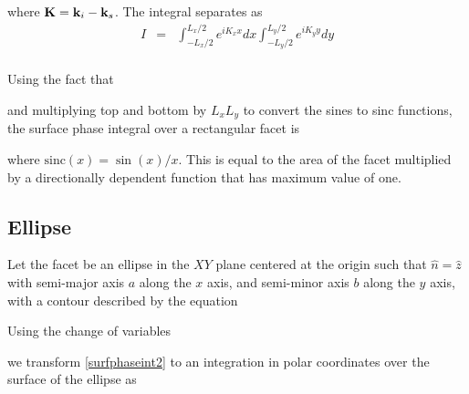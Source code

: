 \noindent where $\mathbf{K} = \mathbf{k}_i - \mathbf{k}_s$. The integral separates as 
\begin{eqnarray}
I &=& \int_{-L_x/2}^{L_x/2}  e^{i K_x x} dx  \int_{-L_y/2}^{L_y/2} e^{i K_y y} dy  \\
\end{eqnarray}

Using the fact that 

and multiplying top and bottom by $L_xL_y$ to convert the sines to sinc functions, the surface phase integral over a rectangular facet is 


\noindent where $\textrm{sinc}(x) = \sin(x)/x$. This is equal to the area of the facet multiplied by a directionally dependent function that has maximum value of one.




\subsection{Ellipse}


Let the facet be an ellipse in the $XY$ plane centered at the origin such that $\hat{n} = \hat{z}$ with semi-major axis $a$ along the $x$ axis, and semi-minor axis $b$ along the $y$ axis, with a contour described by the equation

Using the change of variables

we transform \eqref{surfphaseint2} to an integration in polar coordinates over the surface of the ellipse as 


